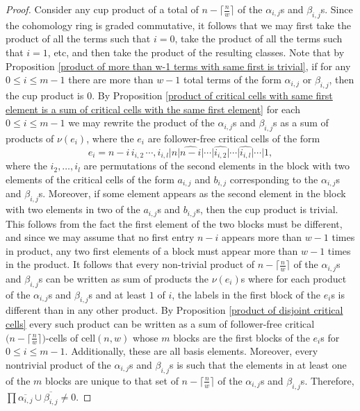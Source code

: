\documentclass[10pt,a4paper]{amsart}
\begin{document}
\begin{proof}
Consider any cup product of a total of $n-\big\lceil\frac{n}{w}\big\rceil$ of the $\alpha_{i,j}$s and $\beta_{i,j}$s.
Since the cohomology ring is graded commutative, it follows that we may first take the product of all the terms such that $i=0$, take the product of all the terms such that $i=1$, etc, and then take the product of the resulting classes.
Note that by Proposition \ref{product of more than w-1 terms with same first is trivial}, if for any $0\le i\le m-1$ there are more than $w-1$ total terms of the form $\alpha_{i,j}$ or $\beta_{i,j}$, then the cup product is $0$. 
By Proposition \ref{product of critical cells with same first element is a sum of critical cells with the same first element} for each  $0\le i\le m-1$ we may rewrite the product of the $\alpha_{i, j}$s and $\beta_{i,j}$s as a sum of products of $\nu(e_{i})$, where the $e_{i}$ are follower-free critical cells of the form
\[
e_{i}=n-i\, i_{i,2}\, \cdots, i_{i,l}|n|\widehat{n-i}|\cdots|\widehat{i_{i,2}}|\cdots|\widehat{i_{i,l}}|\cdots|1,
\]
where the $i_{2},\dots, i_{l}$ are permutations of the second elements in the block with two elements of the critical cells of the form $a_{i,j}$ and $b_{i,j}$ corresponding to the $\alpha_{i, j}$s and $\beta_{i,j}$s.
Moreover, if some element appears as the second element in the block with two elements in two of the $a_{i,j}$s and $b_{i,j}$s, then the cup product is trivial.
This follows from the fact the first element of the two blocks must be different, and since we may assume that no first entry $n-i$ appears more than $w-1$ times in product, any two first elements of a block must appear more than $w-1$ times in the product.
It follows that every non-trivial product of $n-\big\lceil\frac{n}{w}\big\rceil$ of the $\alpha_{i,j}$s and $\beta_{i,j}$s can be written as sum of products the $\nu(e_{i})$s where for each product of the $\alpha_{i,j}$s and $\beta_{i,j}$s and at least $1$ of $i$, the labels in the first block of the $e_{i}$s is different than in any other product.
By Proposition \ref{product of disjoint critical cells} every such product can be written as a sum of follower-free critical $\big(n-\big\lceil\frac{n}{w}\big\rceil\big)$-cells of $\text{cell}(n,w)$ whose $m$ blocks are the first blocks of the $e_{i}$s for $0\le i\le m-1$.
Additionally, these are all basis elements.
Moreover, every nontrivial product of the $\alpha_{i, j}$s and $\beta_{i,j}$s is such that the elements in at least one of the $m$ blocks are unique to that set of $n-\big\lceil\frac{n}{w}\big\rceil$ of the $\alpha_{i,j}$s and $\beta_{i,j}$s.
Therefore, $\prod\overline{\alpha_{i,j}}\cup\overline{\beta_{i,j}}\neq 0$.
\end{proof}
\end{document}

